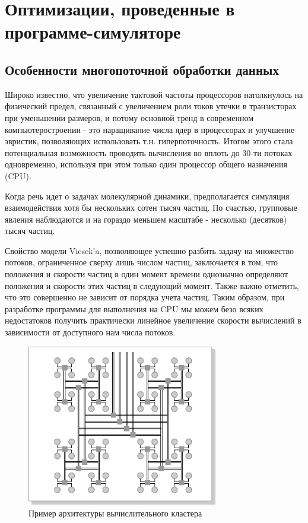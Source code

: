 \section{Оптимизации, проведенные в программе-симуляторе} %
\label{sec:ProgrammOptimisations}

    \subsection{Особенности многопоточной обработки данных} %
    \label{sub:MultithreadMulticoreDataProcessing}
        Широко известно, что увеличение тактовой частоты процессоров натолкнулось на физический предел, связанный с увеличением роли токов утечки в транзисторах при уменьшении размеров, и потому основной тренд в современном компьютеростроении - это наращивание числа ядер в процессорах и улучшение эвристик, позволяющих использовать т.н. гиперпоточность. Итогом этого стала потенциальная возможность проводить вычисления во вплоть до 30-ти потоках одновременно, используя при этом только один процессор общего назначения (CPU).

        Когда речь идет о задачах молекулярной динамики, предполагается симуляция взаимодействия хотя бы нескольких сотен тысяч частиц. По счастью, групповые явления наблюдаются и на гораздо меньшем масштабе - несколько (десятков) тысяч частиц.

        Свойство модели Vicsek'a, позволяющее успешно разбить задачу на множество потоков, ограниченное сверху лишь числом частиц, заключается в том, что положения и скорости частиц в один момент времени однозначно определяют положения и скорости этих частиц в следующий момент. Также важно отметить, что это совершенно не зависит от порядка учета частиц. Таким образом, при разработке программы для выполнения на CPU мы можем безо всяких недостатоков получить практически линейное увеличение скорости вычислений в зависимости от доступного нам числа потоков.

        \begin{figure}[h]
        \centering
            \includegraphics[height=200pt]{Images/KlusterArhitecture}
            \caption{Пример архитектуры вычислительного кластера}
            \label{fig:KlusterArchitecture}
        \end{figure}

